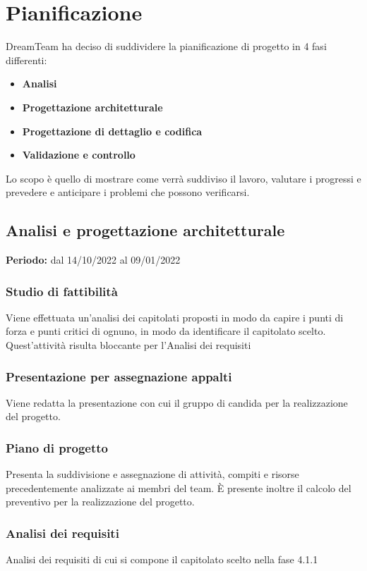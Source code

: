 \section{Pianificazione}
DreamTeam ha deciso di suddividere la pianificazione di progetto in 4 fasi differenti:

\begin{itemize}
\item \textbf{Analisi}
\item \textbf{Progettazione architetturale}
\item \textbf{Progettazione di dettaglio e codifica}
\item	 \textbf{Validazione e controllo}
\end{itemize}

Lo scopo è quello di mostrare come verrà suddiviso il lavoro, valutare i progressi e prevedere e anticipare i problemi che possono verificarsi.

\subsection{Analisi e progettazione architetturale}
\textbf{Periodo:} dal 14/10/2022 al 09/01/2022
\subsubsection{Studio di fattibilità}
Viene effettuata un’analisi dei capitolati proposti in modo da capire i punti di forza e punti critici di ognuno, in modo da identificare il capitolato scelto. Quest’attività risulta bloccante per l’Analisi dei requisiti
\subsubsection{Presentazione per assegnazione appalti}
Viene redatta la presentazione con cui il gruppo di candida per la realizzazione del progetto.
\subsubsection{Piano di progetto}
Presenta la suddivisione e assegnazione di attività, compiti e risorse precedentemente analizzate ai membri del team. È presente inoltre il calcolo del preventivo per la realizzazione del progetto.
\subsubsection{Analisi dei requisiti}
Analisi dei requisiti di cui si compone il capitolato scelto nella fase 4.1.1
